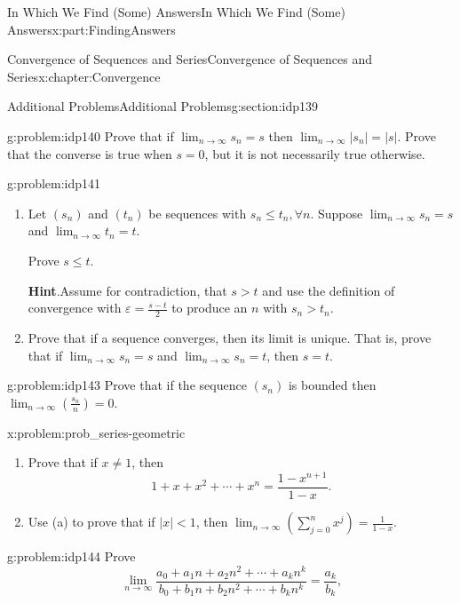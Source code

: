 \documentclass[oneside,10pt,]{book}
\newcommand{\blocktitlefont}{\relax}
\numberwithin{equation}{section}
\newcommand{\eps}{\varepsilon}
\newcommand{\lt}{<}
\begin{document}
\begin{partptx}{In Which We Find (Some) Answers}{}{In Which We Find (Some) Answers}{}{}{x:part:FindingAnswers}
\begin{chapterptx}{Convergence of Sequences and Series}{}{Convergence of Sequences and Series}{}{}{x:chapter:Convergence}
\begin{sectionptx}{Additional Problems}{}{Additional Problems}{}{}{g:section:idp139}
\begin{problem}{}{g:problem:idp140}%
Prove that if \(\lim_{n\rightarrow\infty}s_n=s\) then \(\lim_{n\rightarrow\infty}|s_n|=|s|\). Prove that the converse is true when \(s=0\), but it is not necessarily true otherwise.%
\end{problem}
\begin{problem}{}{g:problem:idp141}%
\begin{enumerate}[font=\bfseries,label=(\alph*),ref=\alph*]
\item{}Let \(\left(s_n\right)\) and \(\left(t_n\right)\) be sequences with \(s_n\leq t_n,\forall n\). Suppose \(\lim_{n\rightarrow\infty}s_n=s\) and \(\lim_{n\rightarrow\infty}t_n=t\).%
\par
Prove \(s\leq t\).%
\par\smallskip%
\noindent\textbf{\blocktitlefont Hint}.\hypertarget{g:hint:idp142}{}\quad{}Assume for contradiction, that \(s>t\) and use the definition of convergence with \(\eps=\frac{s-t}{2}\) to produce an \(n\) with \(s_n>t_n\).%
\item{}Prove that if a sequence converges, then its limit is unique.  That is, prove that if \(\lim_{n\rightarrow\infty}s_n=s\) and \(\lim_{n\rightarrow\infty}s_n=t\), then \(s=t\).%
\end{enumerate}
\end{problem}
\begin{problem}{}{g:problem:idp143}%
Prove that if the sequence \(\left(s_n\right)\) is bounded then \(\lim_{n\rightarrow\infty}\left(\frac{s_n}{n}\right)=0\).%
\end{problem}
\begin{problem}{}{x:problem:prob_series-geometric}%
\begin{enumerate}[font=\bfseries,label=(\alph*),ref=\alph*]
\item{}Prove that if \(x\neq 1\), then%
\begin{equation*}
1+x+x^2+\cdots+x^n=\frac{1-x^{n+1}}{1-x}\text{.}
\end{equation*}
%
\item{}Use (a) to prove that if \(|x|\lt 1\), then \(\lim_{n\rightarrow\infty}\left(\sum_{j=0}^nx^j\right)=\frac{1}{1-x}\).%
\end{enumerate}
\end{problem}
\begin{problem}{}{g:problem:idp144}%
 Prove%
\begin{equation*}
\lim_{n\rightarrow\infty}\frac{a_0+a_1n+a_2n^2+
\cdots+a_kn^k}{b_0+b_1n+b_2n^2+\cdots+b_kn^k}=\frac{a_k}{b_k}\text{,}

\end{equation*}
\end{problem}
\end{sectionptx}
\end{chapterptx}
\end{partptx}
\end{document}

